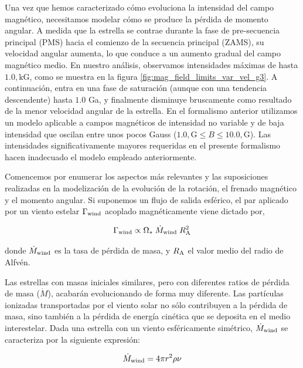 Una vez que hemos caracterizado cómo evoluciona la intensidad del campo magnético, necesitamos modelar cómo se produce la pérdida de momento angular. A medida que la estrella se contrae durante la fase de pre-secuencia principal (PMS) hacia el comienzo de la secuencia principal (ZAMS), su velocidad angular aumenta, lo que conduce a un aumento gradual del campo magnético medio. En nuestro análisis, observamos intensidades máximas de hasta $1.0,\mathrm{kG}$, como se muestra en la figura \ref{fig:mag_field_limits_var_vel_g3}. A continuación, entra en una fase de saturación (aunque con una tendencia descendente) hasta $1.0$ Ga, y finalmente disminuye bruscamente como resultado de la menor velocidad angular de la estrella. En el formalismo anterior utilizamos un modelo aplicable a campos magnéticos de intensidad no variable y de baja intensidad que oscilan entre unos pocos Gauss ($1.0,\mathrm{G} \leq B \leq 10.0,\mathrm{G}$). Las intensidades significativamente mayores requeridas en el presente formalismo hacen inadecuado el modelo empleado anteriormente.\par


Comencemos por enumerar los aspectos más relevantes y las suposiciones realizadas en la modelización de la evolución de la rotación, el frenado magnético y el momento angular. Si suponemos un flujo de salida esférico, el par aplicado por un viento estelar $\Gamma_{\mathrm{wind}}$ acoplado magnéticamente viene dictado por,

\begin{ceqn}
	\begin{equation}
		\Gamma_{\mathrm{wind}} \propto \Omega_* \; \Dot{M}_{\mathrm{wind}} \; R_{\mathrm{A}}^{2} \label{eq:mb_torque}
	\end{equation}
\end{ceqn}

donde $\Dot{M}_{\mathrm{wind}}$ es la tasa de pérdida de masa, y $R_{\mathrm{A}}$ el valor medio del radio de Alfvén. \par

Las estrellas con masas iniciales similares, pero con diferentes ratios de pérdida de masa ($\Dot{M}$), acabarán evolucionando de forma muy diferente. Las partículas ionizadas transportadas por el viento solar no sólo contribuyen a la pérdida de masa, sino también a la pérdida de energía cinética que se deposita en el medio interestelar. Dada una estrella con un viento esféricamente simétrico, $\Dot{M}_{\mathrm{wind}}$ se caracteriza por la siguiente expresión:

\begin{ceqn}
	\begin{equation}
		\Dot{M}_{\mathrm{wind}} = 4\pi r^2\rho\nu \label{eq:mass_loss}
	\end{equation}
\end{ceqn}

